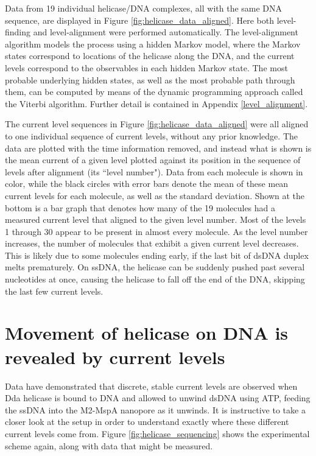 Data from \num{19} individual helicase/DNA complexes, all with the same DNA sequence, are displayed in Figure \ref{fig:helicase_data_aligned}.  Here both level-finding and level-alignment were performed automatically.  The level-alignment algorithm models the process using a hidden Markov model, where the Markov states correspond to locations of the helicase along the DNA, and the current levels correspond to the observables in each hidden Markov state.  The most probable underlying hidden states, as well as the most probable path through them, can be computed by means of the dynamic programming approach called the Viterbi algorithm.  Further detail is contained in Appendix \ref{level_alignment}.

The current level sequences in Figure \ref{fig:helicase_data_aligned} were all aligned to one individual sequence of current levels, without any prior knowledge.  The data are plotted with the time information removed, and instead what is shown is the mean current of a given level plotted against its position in the sequence of levels after alignment (its ``level number").  Data from each molecule is shown in color, while the black circles with error bars denote the mean of these mean current levels for each molecule, as well as the standard deviation.  Shown at the bottom is a bar graph that denotes how many of the \num{19} molecules had a measured current level that aligned to the given level number.  Most of the levels \num{1} through \num{30} appear to be present in almost every molecule.  As the level number increases, the number of molecules that exhibit a given current level decreases.  This is likely due to some molecules ending early, if the last bit of dsDNA duplex melts prematurely.  On ssDNA, the helicase can be suddenly pushed past several nucleotides at once, causing the helicase to fall off the end of the DNA, skipping the last few current levels.

\section{Movement of helicase on DNA is revealed by current levels}

Data have demonstrated that discrete, stable current levels are observed when Dda helicase is bound to DNA and allowed to unwind dsDNA using ATP, feeding the ssDNA into the M2-MspA nanopore as it unwinds.  It is instructive to take a closer look at the setup in order to understand exactly where these different current levels come from.  Figure \ref{fig:helicase_sequencing} shows the experimental scheme again, along with data that might be measured.

